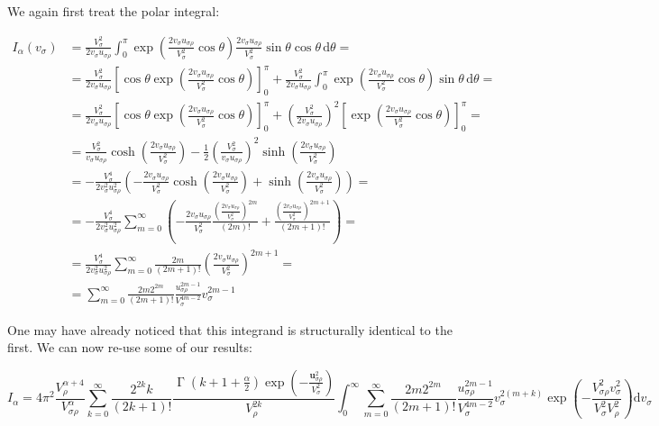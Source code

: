 We again first treat the polar integral:

\begin{align*}
    I_\alpha(v_\sigma)&=\frac{V_\sigma^2}{2v_\sigma u_{\sigma\rho}}\int_0^\pi\exp{\left(\frac{2v_\sigma u_{\sigma\rho}}{V_\sigma^2}\cos{\theta}\right)}\frac{2v_\sigma u_{\sigma\rho}}{V_\sigma^2}\sin{\theta}\cos{\theta}\,\mathrm{d}\theta=\\
    &=\frac{V_\sigma^2}{2v_\sigma u_{\sigma\rho}}\left[\cos{\theta}\exp{\left(\frac{2v_\sigma u_{\sigma\rho}}{V_\sigma^2}\cos{\theta}\right)}\right]_0^\pi+\frac{V_\sigma^2}{2v_\sigma u_{\sigma\rho}}\int_0^\pi\exp{\left(\frac{2v_\sigma u_{\sigma\rho}}{V_\sigma^2}\cos{\theta}\right)}\sin{\theta}\,\mathrm{d}\theta=\\
    &=\frac{V_\sigma^2}{2v_\sigma u_{\sigma\rho}}\left[\cos{\theta}\exp{\left(\frac{2v_\sigma u_{\sigma\rho}}{V_\sigma^2}\cos{\theta}\right)}\right]_0^\pi+\left(\frac{V_\sigma^2}{2v_\sigma u_{\sigma\rho}}\right)^2 \left[\exp{\left(\frac{2v_\sigma u_{\sigma\rho}}{V_\sigma^2}\cos{\theta}\right)}\right]_0^\pi=\\
    &=\frac{V_\sigma^2}{v_\sigma u_{\sigma\rho}}\cosh{\left(\frac{2v_\sigma u_{\sigma\rho}}{V_\sigma^2}\right)}-\frac{1}{2}\left(\frac{V_\sigma^2}{v_\sigma u_{\sigma\rho}}\right)^2 \sinh{\left(\frac{2v_\sigma u_{\sigma\rho}}{V_\sigma^2}\right)}\\
    &=-\frac{V_\sigma^4}{2v_\sigma^2 u_{\sigma\rho}^2}\left(-\frac{2v_\sigma u_{\sigma\rho}}{V_\sigma^2}\cosh{\left(\frac{2v_\sigma u_{\sigma\rho}}{V_\sigma^2}\right)}+\sinh{\left(\frac{2v_\sigma u_{\sigma\rho}}{V_\sigma^2}\right)}\right)=\\
    &=-\frac{V_\sigma^4}{2v_\sigma^2 u_{\sigma\rho}^2}\sum_{m=0}^\infty\left(-\frac{2v_\sigma u_{\sigma\rho}}{V_\sigma^2}\frac{\left(\frac{2v_\sigma u_{\sigma\rho}}{V_\sigma^2}\right)^{2m}}{(2m)!}+\frac{\left(\frac{2v_\sigma u_{\sigma\rho}}{V_\sigma^2}\right)^{2m+1}}{(2m+1)!}\right)=\\
    &=\frac{V_\sigma^4}{2v_\sigma^2 u_{\sigma\rho}^2}\sum_{m=0}^\infty \frac{2m}{(2m+1)!}\left(\frac{2v_\sigma u_{\sigma\rho}}{V_\sigma^2}\right)^{2m+1}=\\
    &=\sum_{m=0}^\infty \frac{2m 2^{2m}}{(2m+1)!}\frac{u_{\sigma\rho}^{2m-1}}{V_\sigma^{4m-2}}v_\sigma^{2m-1}
\end{align*}

One may have already noticed that this integrand is structurally identical to the first. We can now re-use some of our results:

\begin{equation*}
    I_\alpha=4\pi^2\frac{V_\rho^{\alpha+4}}{V_{\sigma\rho}^\alpha}\sum_{k=0}^\infty\frac{2^{2k}k}{(2k+1)!}\frac{\operatorname{\Gamma}{\left(k+1+\frac{\alpha}{2}\right)}\exp{\left(-\frac{\mathbf{u}_{\sigma\rho}^2}{V_\sigma^2}\right)}}{V_\rho^{2k}}\int_0^\infty \sum_{m=0}^\infty \frac{2m 2^{2m}}{(2m+1)!}\frac{u_{\sigma\rho}^{2m-1}}{V_{\sigma}^{4m-2}}v_\sigma^{2(m+k)}\exp{\left(-\frac{V_{\sigma\rho}^2v_\sigma^2}{V_\sigma^2 V_\rho^2}\right)}\mathrm{d}v_\sigma
\end{equation*}

